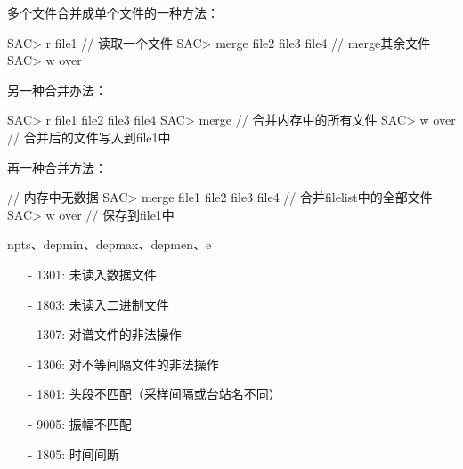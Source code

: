 多个文件合并成单个文件的一种方法：
\begin{SACCode}
SAC> r file1                        // 读取一个文件
SAC> merge file2 file3 file4        // merge其余文件
SAC> w over
\end{SACCode}

另一种合并办法：
\begin{SACCode}
SAC> r file1 file2 file3 file4
SAC> merge                      // 合并内存中的所有文件
SAC> w over                     // 合并后的文件写入到file1中
\end{SACCode}

再一种合并方法：
\begin{SACCode}                     // 内存中无数据
SAC> merge file1 file2 file3 file4  // 合并filelist中的全部文件
SAC> w over                         // 保存到file1中
\end{SACCode}

npts、depmin、depmax、depmen、e

\begin{itemize}
\item[-]1301: 未读入数据文件
\item[-]1803: 未读入二进制文件
\item[-]1307: 对谱文件的非法操作
\item[-]1306: 对不等间隔文件的非法操作
\item[-]1801: 头段不匹配（采样间隔或台站名不同）
\item[-]9005: 振幅不匹配
\end{itemize}

\begin{itemize}
\item[-]1805: 时间间断
\end{itemize}

